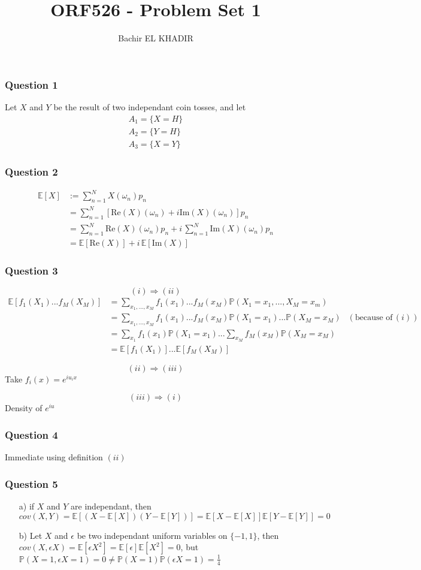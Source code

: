 \documentclass[12pt]{article}
\title{ORF526 - Problem Set 1}
\author{Bachir EL KHADIR }
\newcommand{\Q}[1]{\subsubsection*{Question #1}}
\begin{document}
\maketitle

\Q{1} 
Let $X$ and $Y$ be the result of two independant coin tosses, and let
\begin{align*}
  A_1 = \{X = H\} \\
  A_2 = \{Y = H\} \\
  A_3 = \{X = Y\} 
\end{align*}
  

\Q{2}
\begin{align*}
  \mathbb{E}[X]
  & := \sum_{n=1}^{N} X(\omega_n) p_n \\
  & = \sum_{n=1}^{N} \left[ \text{Re}(X)(\omega_n) + i \text{Im}(X)(\omega_n) \right] p_n \\
  & = \sum_{n=1}^{N} \text{Re}(X)(\omega_n) p_n
    + i \, \sum_{n=1}^{N}  \text{Im}(X)(\omega_n)  p_n \\
  & = \mathbb{E}[\text{Re}(X)] + i \, \mathbb{E}[\text{Im}(X)]
\end{align*}

\Q{3}

$$(i) \Rightarrow (ii)$$
\begin{align*}
  \mathbb{E}[f_1(X_1) ... f_M(X_M)]
  &= \sum_{x_1, ..., x_M} f_1(x_1) ... f_M(x_M) \mathbb{P}(X_1 = x_1, ..., X_M = x_m)\\
  &= \sum_{x_1, ..., x_M} f_1(x_1) ... f_M(x_M) \mathbb{P}(X_1 = x_1) ... \mathbb{P}(X_M = x_M) & (\text{because of} \, (i)) \\
  &= \sum_{x_1} f_1(x_1) \mathbb{P}(X_1=x_1) ... \sum_{x_M}  f_M(x_M) \mathbb{P}(X_M = x_M) \\
  &= \mathbb{E}[f_1(X_1)] ... \mathbb{E}[f_M(X_M)]
\end{align*}


$$(ii) \Rightarrow (iii)$$
Take $f_i(x) = e^{i u_i x}$

$$(iii) \Rightarrow (i)$$
Density of $e^{iu}$

\Q{4} Immediate using definition $(ii)$
\Q{5}
\begin{itemize}
\item [a)] if $X$ and $Y$ are independant, then $cov(X, Y) = \mathbb{E}\left[(X - \mathbb{E}[X]) (Y - \mathbb{E}[Y]) \right] = \mathbb{E}[X - \mathbb{E}[X]] \mathbb{E}[Y - \mathbb{E}[Y]] = 0$
\item [b)] Let $X$ and $\epsilon$ be two independant uniform variables on $\{-1, 1\}$, then $cov(X, \epsilon X) = \mathbb{E}[\epsilon X^2]  = \mathbb{E}[\epsilon] \mathbb{E}[X^2] = 0$, but $\mathbb{P}(X = 1, \epsilon X = 1) = 0 \neq \mathbb{P}(X = 1) \mathbb{P}(\epsilon X = 1) = \frac{1}{4}$
\end{itemize}
\end{document}
